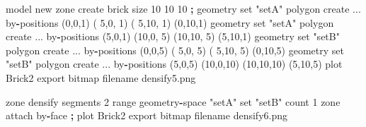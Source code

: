 \documentclass[a4paper, nobind]{templates/ociamthesis}
\newenvironment{Shaded}{\begin{snugshade}}{\end{snugshade}}
\newcommand{\BuiltInTok}[1]{#1}
\newcommand{\DecValTok}[1]{\textcolor[rgb]{0.00,0.00,0.81}{#1}}
\newcommand{\NormalTok}[1]{#1}
\newcommand{\OperatorTok}[1]{\textcolor[rgb]{0.81,0.36,0.00}{\textbf{#1}}}
\newcommand{\StringTok}[1]{\textcolor[rgb]{0.31,0.60,0.02}{#1}}
\renewenvironment{Shaded}
{
  \vspace{10pt}%
  \begin{snugshade}%
}{%
  \end{snugshade}%
  \vspace{8pt}%
}
\begin{document}
\begin{Shaded}
\begin{Highlighting}[]
\NormalTok{model new}
\NormalTok{zone create brick size }\DecValTok{10} \DecValTok{10} \DecValTok{10}
\OperatorTok{;}
\NormalTok{geometry }\BuiltInTok{set} \StringTok{"setA"}\NormalTok{ polygon create ...}
\NormalTok{                    by}\OperatorTok{{-}}\NormalTok{positions (}\DecValTok{0}\NormalTok{,}\DecValTok{0}\NormalTok{,}\DecValTok{1}\NormalTok{) ( }\DecValTok{5}\NormalTok{,}\DecValTok{0}\NormalTok{, }\DecValTok{1}\NormalTok{) ( }\DecValTok{5}\NormalTok{,}\DecValTok{10}\NormalTok{, }\DecValTok{1}\NormalTok{) (}\DecValTok{0}\NormalTok{,}\DecValTok{10}\NormalTok{,}\DecValTok{1}\NormalTok{)}
\NormalTok{geometry }\BuiltInTok{set} \StringTok{"setA"}\NormalTok{ polygon create ...}
\NormalTok{                    by}\OperatorTok{{-}}\NormalTok{positions (}\DecValTok{5}\NormalTok{,}\DecValTok{0}\NormalTok{,}\DecValTok{1}\NormalTok{) (}\DecValTok{10}\NormalTok{,}\DecValTok{0}\NormalTok{, }\DecValTok{5}\NormalTok{) (}\DecValTok{10}\NormalTok{,}\DecValTok{10}\NormalTok{, }\DecValTok{5}\NormalTok{) (}\DecValTok{5}\NormalTok{,}\DecValTok{10}\NormalTok{,}\DecValTok{1}\NormalTok{)}
\NormalTok{geometry }\BuiltInTok{set} \StringTok{"setB"}\NormalTok{ polygon create ...}
\NormalTok{                    by}\OperatorTok{{-}}\NormalTok{positions (}\DecValTok{0}\NormalTok{,}\DecValTok{0}\NormalTok{,}\DecValTok{5}\NormalTok{) ( }\DecValTok{5}\NormalTok{,}\DecValTok{0}\NormalTok{, }\DecValTok{5}\NormalTok{) ( }\DecValTok{5}\NormalTok{,}\DecValTok{10}\NormalTok{, }\DecValTok{5}\NormalTok{) (}\DecValTok{0}\NormalTok{,}\DecValTok{10}\NormalTok{,}\DecValTok{5}\NormalTok{)}
\NormalTok{geometry }\BuiltInTok{set} \StringTok{"setB"}\NormalTok{ polygon create ...}
\NormalTok{                    by}\OperatorTok{{-}}\NormalTok{positions (}\DecValTok{5}\NormalTok{,}\DecValTok{0}\NormalTok{,}\DecValTok{5}\NormalTok{) (}\DecValTok{10}\NormalTok{,}\DecValTok{0}\NormalTok{,}\DecValTok{10}\NormalTok{) (}\DecValTok{10}\NormalTok{,}\DecValTok{10}\NormalTok{,}\DecValTok{10}\NormalTok{) (}\DecValTok{5}\NormalTok{,}\DecValTok{10}\NormalTok{,}\DecValTok{5}\NormalTok{)}
\NormalTok{plot }\StringTok{\textquotesingle{}Brick2\textquotesingle{}}\NormalTok{ export bitmap filename }\StringTok{\textquotesingle{}densify5.png\textquotesingle{}}

\NormalTok{zone densify segments }\DecValTok{2} \BuiltInTok{range}\NormalTok{ geometry}\OperatorTok{{-}}\NormalTok{space }\StringTok{"setA"} \BuiltInTok{set} \StringTok{"setB"}\NormalTok{ count }\DecValTok{1}
\NormalTok{zone attach by}\OperatorTok{{-}}\NormalTok{face}
\OperatorTok{;}
\NormalTok{plot }\StringTok{\textquotesingle{}Brick2\textquotesingle{}}\NormalTok{ export bitmap filename }\StringTok{\textquotesingle{}densify6.png\textquotesingle{}}
\end{Highlighting}
\end{Shaded}
\end{document}
